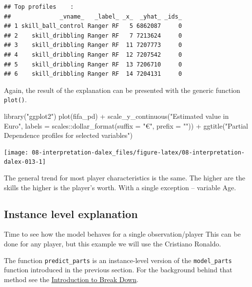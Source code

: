 \documentclass[
]{scrbook}
\newenvironment{Shaded}{\begin{snugshade}}{\end{snugshade}}
\newcommand{\AttributeTok}[1]{\textcolor[rgb]{0.77,0.63,0.00}{#1}}
\newcommand{\FunctionTok}[1]{\textcolor[rgb]{0.00,0.00,0.00}{#1}}
\newcommand{\NormalTok}[1]{#1}
\newcommand{\SpecialCharTok}[1]{\textcolor[rgb]{0.00,0.00,0.00}{#1}}
\newcommand{\StringTok}[1]{\textcolor[rgb]{0.31,0.60,0.02}{#1}}
\renewenvironment{Shaded} {\begin{snugshade}\small} {\end{snugshade}}
\begin{document}
\begin{verbatim}
## Top profiles    : 
##              _vname_   _label_ _x_  _yhat_ _ids_
## 1 skill_ball_control Ranger RF   5 6862087     0
## 2    skill_dribbling Ranger RF   7 7213624     0
## 3    skill_dribbling Ranger RF  11 7207773     0
## 4    skill_dribbling Ranger RF  12 7207542     0
## 5    skill_dribbling Ranger RF  13 7206710     0
## 6    skill_dribbling Ranger RF  14 7204131     0
\end{verbatim}

Again, the result of the explanation can be presented with the generic function \texttt{plot()}.

\begin{Shaded}
\begin{Highlighting}[]
\FunctionTok{library}\NormalTok{(}\StringTok{"ggplot2"}\NormalTok{)}
\FunctionTok{plot}\NormalTok{(fifa\_pd) }\SpecialCharTok{+}
  \FunctionTok{scale\_y\_continuous}\NormalTok{(}\StringTok{"Estimated value in Euro"}\NormalTok{, }\AttributeTok{labels =}\NormalTok{ scales}\SpecialCharTok{::}\FunctionTok{dollar\_format}\NormalTok{(}\AttributeTok{suffix =} \StringTok{"€"}\NormalTok{, }\AttributeTok{prefix =} \StringTok{""}\NormalTok{)) }\SpecialCharTok{+}
  \FunctionTok{ggtitle}\NormalTok{(}\StringTok{"Partial Dependence profiles for selected variables"}\NormalTok{)}
\end{Highlighting}
\end{Shaded}

\begin{center}\texttt{[image: 08-interpretation-dalex\_files/figure-latex/08-interpretation-dalex-013-1]} \end{center}

The general trend for most player characteristics is the same. The higher are the skills the higher is the player's worth. With a single exception -- variable Age.

\hypertarget{interpretability-instance-level}{%
\subsection{Instance level explanation}\label{interpretability-instance-level}}

Time to see how the model behaves for a single observation/player
This can be done for any player, but this example we will use the Cristiano Ronaldo.

The function \texttt{predict\_parts} is an instance-level version of the \texttt{model\_parts} function introduced in the previous section. For the background behind that method see the \href{https://pbiecek.github.io/ema/breakDown.html}{Introduction to Break Down}.
\end{document}
